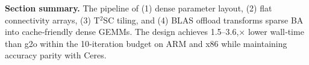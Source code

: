 \textbf{Section summary.} The pipeline of (1) dense parameter layout, (2) flat connectivity arrays, (3)
T$^{2}$SC tiling, and (4) BLAS offload transforms sparse BA into cache‑friendly dense GEMMs. The design
achieves 1.5–3.6,× lower wall‑time than g2o within the 10‑iteration budget on ARM and x86 while
maintaining accuracy parity with Ceres.


